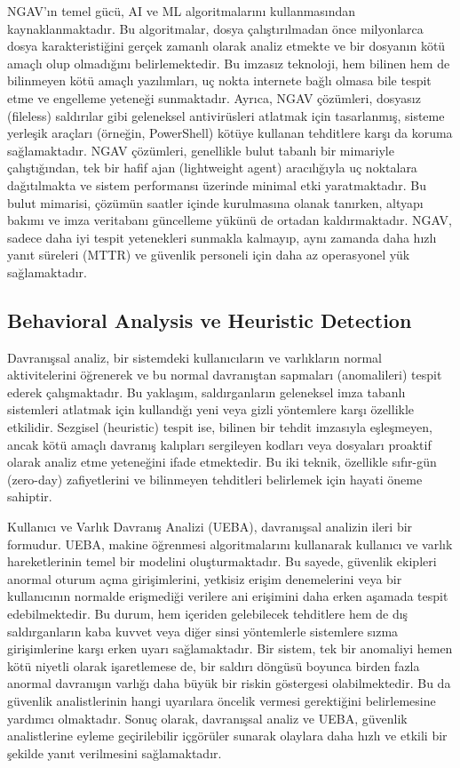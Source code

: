 NGAV'ın temel gücü, AI ve ML algoritmalarını kullanmasından kaynaklanmaktadır. Bu algoritmalar, dosya çalıştırılmadan önce milyonlarca dosya karakteristiğini gerçek zamanlı olarak analiz etmekte ve bir dosyanın kötü amaçlı olup olmadığını belirlemektedir. Bu imzasız teknoloji, hem bilinen hem de bilinmeyen kötü amaçlı yazılımları, uç nokta internete bağlı olmasa bile tespit etme ve engelleme yeteneği sunmaktadır. Ayrıca, NGAV çözümleri, dosyasız (fileless) saldırılar gibi geleneksel antivirüsleri atlatmak için tasarlanmış, sisteme yerleşik araçları (örneğin, PowerShell) kötüye kullanan tehditlere karşı da koruma sağlamaktadır. NGAV çözümleri, genellikle bulut tabanlı bir mimariyle çalıştığından, tek bir hafif ajan (lightweight agent) aracılığıyla uç noktalara dağıtılmakta ve sistem performansı üzerinde minimal etki yaratmaktadır. Bu bulut mimarisi, çözümün saatler içinde kurulmasına olanak tanırken, altyapı bakımı ve imza veritabanı güncelleme yükünü de ortadan kaldırmaktadır. NGAV, sadece daha iyi tespit yetenekleri sunmakla kalmayıp, aynı zamanda daha hızlı yanıt süreleri (MTTR) ve güvenlik personeli için daha az operasyonel yük sağlamaktadır.

\subsection{Behavioral Analysis ve Heuristic Detection}

Davranışsal analiz, bir sistemdeki kullanıcıların ve varlıkların normal aktivitelerini öğrenerek ve bu normal davranıştan sapmaları (anomalileri) tespit ederek çalışmaktadır. Bu yaklaşım, saldırganların geleneksel imza tabanlı sistemleri atlatmak için kullandığı yeni veya gizli yöntemlere karşı özellikle etkilidir. Sezgisel (heuristic) tespit ise, bilinen bir tehdit imzasıyla eşleşmeyen, ancak kötü amaçlı davranış kalıpları sergileyen kodları veya dosyaları proaktif olarak analiz etme yeteneğini ifade etmektedir. Bu iki teknik, özellikle sıfır-gün (zero-day) zafiyetlerini ve bilinmeyen tehditleri belirlemek için hayati öneme sahiptir.

Kullanıcı ve Varlık Davranış Analizi (UEBA), davranışsal analizin ileri bir formudur. UEBA, makine öğrenmesi algoritmalarını kullanarak kullanıcı ve varlık hareketlerinin temel bir modelini oluşturmaktadır. Bu sayede, güvenlik ekipleri anormal oturum açma girişimlerini, yetkisiz erişim denemelerini veya bir kullanıcının normalde erişmediği verilere ani erişimini daha erken aşamada tespit edebilmektedir. Bu durum, hem içeriden gelebilecek tehditlere hem de dış saldırganların kaba kuvvet veya diğer sinsi yöntemlerle sistemlere sızma girişimlerine karşı erken uyarı sağlamaktadır. Bir sistem, tek bir anomaliyi hemen kötü niyetli olarak işaretlemese de, bir saldırı döngüsü boyunca birden fazla anormal davranışın varlığı daha büyük bir riskin göstergesi olabilmektedir. Bu da güvenlik analistlerinin hangi uyarılara öncelik vermesi gerektiğini belirlemesine yardımcı olmaktadır. Sonuç olarak, davranışsal analiz ve UEBA, güvenlik analistlerine eyleme geçirilebilir içgörüler sunarak olaylara daha hızlı ve etkili bir şekilde yanıt verilmesini sağlamaktadır.

